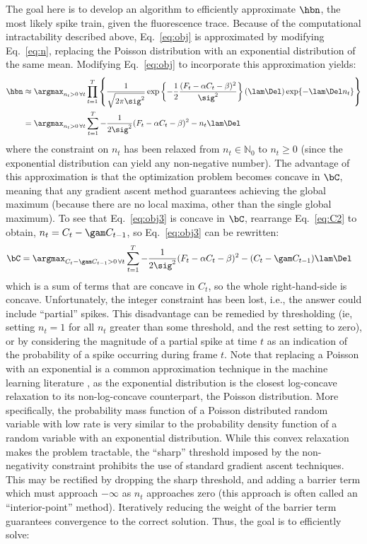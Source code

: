 The goal here is to develop an algorithm to efficiently approximate $\hbn$, the most likely spike train, given the fluorescence trace. Because of the computational intractability described above, Eq.~\eqref{eq:obj} is approximated by modifying Eq.~\eqref{eq:n}, replacing the Poisson distribution with an exponential distribution of the same mean. Modifying Eq.~\eqref{eq:obj} to incorporate this approximation yields:
\begin{subequations}
\begin{align} \label{eq:obj2}
\hbn &\approx \argmax_{n_t>0 \, \forall t} \prod_{t=1}^T  \left\{\frac{1}{\sqrt{2 \pi \sig^2}} \exp \left\{-\frac{1}{2}\frac{(F_t - \alpha C_t - \beta)^2}{\sig^2}\right\}  (\lam\Del) \exp\{-\lam\Del n_t\}\right\}
\\ &= \argmax_{n_t>0 \, \forall t}  \sum_{t=1}^T -\frac{1}{2 \sig^2}(F_t - \alpha C_t - \beta)^2  - n_t \lam \Del  \label{eq:obj3}
\end{align}
\end{subequations}
where the constraint on $n_t$ has been relaxed from  $n_t \in \mathbb{N}_0$ to $n_t \geq 0$ (since the exponential distribution can yield any non-negative number).  The advantage of this approximation is that the optimization problem becomes concave in $\bC$, meaning that any gradient ascent method guarantees achieving the global maximum (because there are no local maxima, other than the single global maximum).  To see that Eq.~\eqref{eq:obj3} is concave in $\bC$, rearrange Eq.~\eqref{eq:C2} to obtain, $n_t=C_t-\gam C_{t-1}$, so Eq.~\eqref{eq:obj3} can be rewritten:
\begin{align}
\bC &= \argmax_{C_t-\gam C_{t-1}>0 \, \forall t}  \sum_{t=1}^T -\frac{1}{2 \sig^2}(F_t - \alpha C_t - \beta)^2  - (C_t -\gam C_{t-1}) \lam \Del  \label{eq:obj4}
\end{align}
\noindent which is a sum of terms that are concave in $C_t$, so the whole right-hand-side is concave. Unfortunately, the integer constraint has been lost, i.e.,  the answer could include ``partial'' spikes.  This disadvantage can be remedied by thresholding (ie, setting $n_t=1$ for all $n_t$ greater than some threshold, and the rest setting to zero), or by considering the magnitude of a partial spike at time $t$ as an indication of the probability of a spike occurring during frame $t$. Note that replacing a Poisson with an exponential is a common approximation technique in the machine learning literature \cite{CONV04, PaninskiWu09}, as the exponential distribution is the closest log-concave relaxation to its non-log-concave counterpart, the Poisson distribution. More specifically, the probability mass function of a Poisson distributed random variable with low rate is very similar to the probability density function of a random variable with an exponential distribution. While this convex relaxation makes the problem tractable, the ``sharp'' threshold imposed by the non-negativity constraint prohibits the use of standard gradient ascent techniques. This may be rectified by dropping the sharp threshold, and adding a barrier term which must approach $-\infty$ as $n_t$ approaches zero (this approach is often called an ``interior-point'' method). Iteratively reducing the weight of the barrier term guarantees convergence to the correct solution.  Thus, the goal is to efficiently solve:
